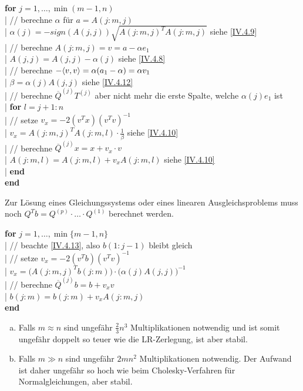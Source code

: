 \begin{pseudocode}{\linewidth}
	\textbf{for} $j = 1,\dots, \min(m - 1, n)$ \\
	|	\>	// berechne $\alpha$ für $a = A(j : m, j)$ \\
	|	\>	$\alpha(j) = -sign(A(j, j))\sqrt{A(j:m, j)^T A(j:m, j)}$ \>\>\>\> siehe \eqref{IV.4.9}\\
	|	\>  // berechne $A(j:m,j)=v=a-\alpha e_1$ \\
	|	\>	$A(j,j)=A(j,j)-\alpha(j)$ \>\>\>\> siehe \eqref{IV.4.8}\\
	|	\> // berechne $-\langle v, v \rangle = \alpha(a_1 - \alpha) = \alpha v_1$ \\
	|	\> $\beta = \alpha(j)A(j, j)$\>\>\>\> siehe \eqref{IV.4.12}\\
	|	\> // berechne $\overline{Q}^{(j)}T^{(j)}$ 
			aber nicht mehr die erste Spalte, welche $\alpha(j)e_1$ ist\\
	|	\> \textbf{for} $l = j + 1 : n$\\
	|		\>\> // setze $v_x = -2{(v^Tx)}{(v^Tv)}^{-1}$\\
	|		\>\> $v_x = A(j : m, j)^TA(j:m,l)\cdot \frac{1}{\beta}$ \>\>\>siehe \eqref{IV.4.10}\\
	|		\>\> // berechne  $\overline{Q}^{(j)}x=x+v_x\cdot v$\\
	|		\>\> $A(j:m,l) = A(j:m,l)+v_xA(j:m,l)$ \>\>\> siehe \eqref{IV.4.10}\\
	|	\>\textbf{end}\\
	\textbf{end}
\end{pseudocode}


Zur Lösung eines Gleichungssystems oder eines linearen Ausgleichsproblems
muss noch $Q^Tb=Q^{(p)}\cdot \dots \cdot Q^{(1)}$ berechnet werden.

\begin{pseudocode}{0.7\linewidth}
	\textbf{for} $j=1,\dots, \min\{m-1,n\}$\\
	|	\> // beachte \eqref{IV.4.13}, also $b(1:j-1)$ bleibt gleich\\
	|	\> // setze $v_x=-2(v^Tb)(v^Tv)^{-1}$\\
	|	\> $v_x=\big(A(j:m,j)^Tb(j:m)\big)\cdot \big(\alpha(j)A(j,j)\big)^{-1}$ \\
	|	\> // berechne $\overline{Q}^{(j)} b=b+v_xv$\\
	|	\> $b(j:m) = b(j:m)+v_xA(j:m,j)$\\
	\textbf{end}
\end{pseudocode}


\begin{enumerate}[a)]
	\item Falls $m\approx n$ sind ungefähr $\frac{2}{3}n^3$ Multiplikationen notwendig
	und ist somit ungefähr doppelt so teuer wie die LR-Zerlegung, ist aber stabil.
	\item Falls $m\gg n$ sind ungefähr $2mn^2$ Multiplikationen notwendig.
	Der Aufwand ist daher ungefähr so hoch wie beim Cholesky-Verfahren für Normalgleichungen,
	aber stabil.
\end{enumerate}
